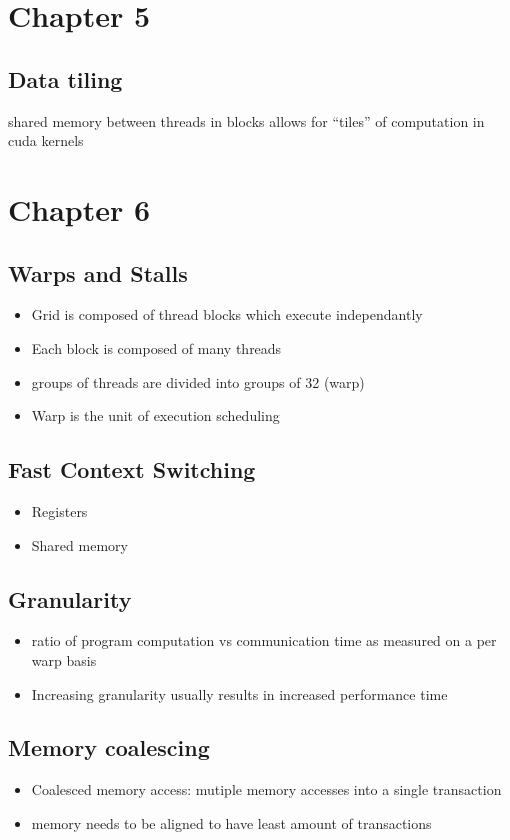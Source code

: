 \documentclass{assignments}
\begin{document}
\section*{Chapter 5}
\label{sec:orgbff40b6}
\subsection*{Data tiling}
\label{sec:orge2bd619}
shared memory between threads in blocks allows for ``tiles'' of computation in
cuda kernels

\section*{Chapter 6}
\label{sec:org467388d}
\subsection*{Warps and Stalls}
\label{sec:org992af16}
\begin{itemize}
\item Grid is composed of thread blocks which execute independantly
\item Each block is composed of many threads
\item groups of threads are divided into groups of 32 (warp)
\item Warp is the unit of execution scheduling
\end{itemize}
\subsection*{Fast Context Switching}
\label{sec:org03e60d7}
\begin{itemize}
\item Registers
\item Shared memory
\end{itemize}
\subsection*{Granularity}
\label{sec:org15b80bc}
\begin{itemize}
\item ratio of program computation vs communication time as measured on a per warp basis
\item Increasing granularity usually results in increased performance time
\end{itemize}
\subsection*{Memory coalescing}
\label{sec:org3f7673b}
\begin{itemize}
\item Coalesced memory access: mutiple memory accesses into a single transaction
\item memory needs to be aligned to have least amount of transactions
\end{itemize}
\end{document}
